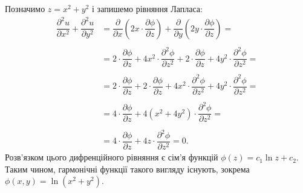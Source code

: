 \begin{solution}
    Позначимо $z = x^2 + y^2$ і запишемо рівняння Лапласа:
    \begin{align*}
        \dfrac{\partial^2 u}{\partial x^2} + \dfrac{\partial^2 u}{\partial y^2} &= \dfrac{\partial}{\partial x} \left(2x \cdot \dfrac{\partial \phi}{\partial z}\right) + \dfrac{\partial}{\partial y} \left(2y \cdot \dfrac{\partial \phi}{\partial z}\right) = \\
        \\
        &= 2 \cdot \dfrac{\partial \phi}{\partial z} + 4 x^2 \cdot \dfrac{\partial^2 \phi}{\partial z^2} + 2 \cdot \dfrac{\partial \phi}{\partial z} + 4 y^2 \cdot \dfrac{\partial^2 \phi}{\partial z^2} = \\
        \\
        &= 2 \cdot \dfrac{\partial \phi}{\partial z} + 2 \cdot \dfrac{\partial \phi}{\partial z} + 4 x^2 \cdot \dfrac{\partial^2 \phi}{\partial z^2} + 4 y^2 \cdot \dfrac{\partial^2 \phi}{\partial z^2} = \\
        \\
        &= 4 \cdot \dfrac{\partial \phi}{\partial z} + 4 (x^2 + 4 y^2) \cdot \dfrac{\partial^2 \phi}{\partial z^2} = \\
        \\
        &= 4 \cdot \dfrac{\partial \phi}{\partial z} + 4 z \cdot \dfrac{\partial^2 \phi}{\partial z^2} = 0.
    \end{align*}
    Розв'язком цього дифренційного рівняння є сім'я функцій $\phi(z) = c_1 \ln z + c_2$. \\ 
    
    Таким чином, гармонічні функції такого вигляду існують, зокрема $\phi(x, y) = \ln (x^2 + y^2)$.
\end{solution}